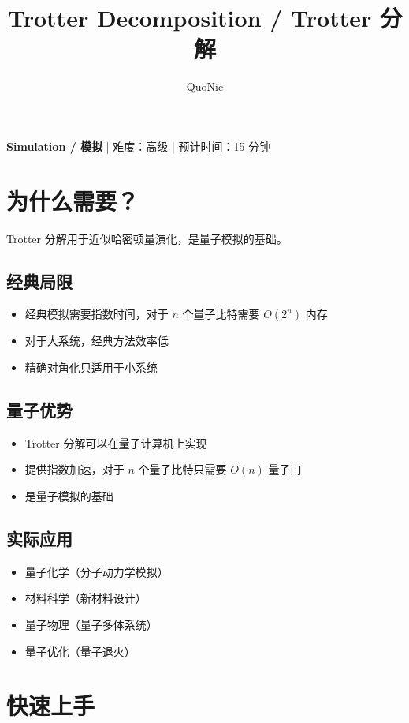 \documentclass[12pt,a4paper]{article}
\title{Trotter Decomposition / Trotter 分解}
\author{QuoNic}
\date{}
\begin{document}
\maketitle

\begin{center}
\textbf{Simulation / 模拟} | 难度：高级 | 预计时间：15 分钟
\end{center}

\tableofcontents
\newpage

\section{为什么需要？}

Trotter 分解用于近似哈密顿量演化，是量子模拟的基础。

\subsection{经典局限}
\begin{itemize}
  \item 经典模拟需要指数时间，对于 $n$ 个量子比特需要 $O(2^n)$ 内存
  \item 对于大系统，经典方法效率低
  \item 精确对角化只适用于小系统
\end{itemize}

\subsection{量子优势}
\begin{itemize}
  \item Trotter 分解可以在量子计算机上实现
  \item 提供指数加速，对于 $n$ 个量子比特只需要 $O(n)$ 量子门
  \item 是量子模拟的基础
\end{itemize}

\subsection{实际应用}
\begin{itemize}
  \item 量子化学（分子动力学模拟）
  \item 材料科学（新材料设计）
  \item 量子物理（量子多体系统）
  \item 量子优化（量子退火）
\end{itemize}

\section{快速上手}
\end{document}
